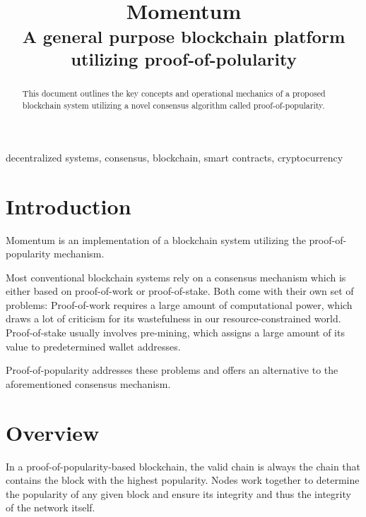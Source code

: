 \documentclass[conference]{IEEEtran}
\begin{document}
\title{Momentum\\
{\footnotesize \textsuperscript{A general purpose blockchain platform utilizing proof-of-polularity}}
}

\author{
}

\maketitle

\begin{abstract}
This document outlines the key concepts and operational mechanics of a proposed blockchain
system utilizing a novel consensus algorithm called proof-of-popularity.
\end{abstract}

\begin{IEEEkeywords}
decentralized systems, consensus, blockchain, smart contracts, cryptocurrency
\end{IEEEkeywords}

\section{Introduction}
Momentum is an implementation of a blockchain system utilizing the proof-of-popularity mechanism.

Most conventional blockchain systems rely on a consensus mechanism which is either based on proof-of-work
or proof-of-stake. Both come with their own set of problems: Proof-of-work requires a large amount of computational power,
which draws a lot of criticism for its wastefulness in our resource-constrained world. Proof-of-stake
usually involves pre-mining, which assigns a large amount of its value to predetermined wallet addresses.

Proof-of-popularity addresses these problems and offers an alternative to the aforementioned consensus mechanism.

\section{Overview}
In a proof-of-popularity-based blockchain, the valid chain is always the chain that contains the block with the highest popularity.
Nodes work together to determine the popularity of any given block and ensure its integrity and thus the integrity of the network itself.
\end{document}
